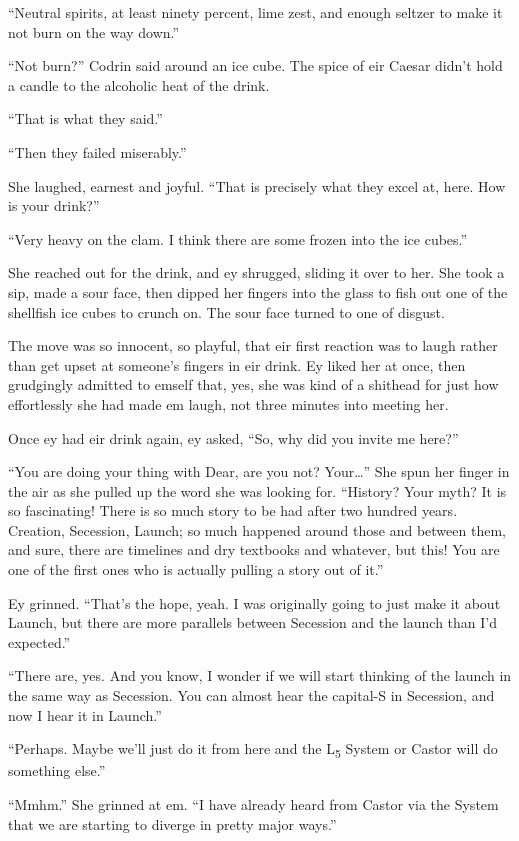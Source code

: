``Neutral spirits, at least ninety percent, lime zest, and enough seltzer to make it not burn on the way down.''

``Not burn?'' Codrin said around an ice cube. The spice of eir Caesar didn't hold a candle to the alcoholic heat of the drink.

``That is what they said.''

``Then they failed miserably.''

She laughed, earnest and joyful. ``That is precisely what they excel at, here. How is your drink?''

``Very heavy on the clam. I think there are some frozen into the ice cubes.''

She reached out for the drink, and ey shrugged, sliding it over to her. She took a sip, made a sour face, then dipped her fingers into the glass to fish out one of the shellfish ice cubes to crunch on. The sour face turned to one of disgust.

The move was so innocent, so playful, that eir first reaction was to laugh rather than get upset at someone's fingers in eir drink. Ey liked her at once, then grudgingly admitted to emself that, yes, she was kind of a shithead for just how effortlessly she had made em laugh, not three minutes into meeting her.

Once ey had eir drink again, ey asked, ``So, why did you invite me here?''

``You are doing your thing with Dear, are you not? Your\ldots{}'' She spun her finger in the air as she pulled up the word she was looking for. ``History? Your myth? It is so fascinating! There is so much story to be had after two hundred years. Creation, Secession, Launch; so much happened around those and between them, and sure, there are timelines and dry textbooks and whatever, but this! You are one of the first ones who is actually pulling a story out of it.''

Ey grinned. ``That's the hope, yeah. I was originally going to just make it about Launch, but there are more parallels between Secession and the launch than I'd expected.''

``There are, yes. And you know, I wonder if we will start thinking of the launch in the same way as Secession. You can almost hear the capital-S in Secession, and now I hear it in Launch.''

``Perhaps. Maybe we'll just do it from here and the L\textsubscript{5} System or Castor will do something else.''

``Mmhm.'' She grinned at em. ``I have already heard from Castor via the System that we are starting to diverge in pretty major ways.''

